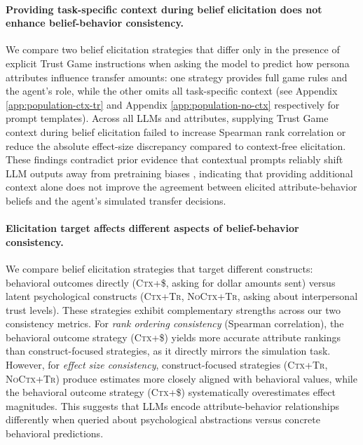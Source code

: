 \documentclass{article} %
\begin{document}
\paragraph{Providing task-specific context during belief elicitation does not enhance belief-behavior consistency.}
We compare two belief elicitation strategies that differ only in the presence of explicit Trust Game instructions when asking the model to predict how persona attributes influence transfer amounts: one strategy provides full game rules and the agent's role, while the other omits all task-specific context (see Appendix \ref{app:population-ctx-tr} and Appendix \ref{app:population-no-ctx} respectively for prompt templates). Across all LLMs and attributes, supplying Trust Game context during belief elicitation failed to increase Spearman rank correlation or reduce the absolute effect-size discrepancy compared to context-free elicitation. These findings contradict prior evidence that contextual prompts reliably shift LLM outputs away from pretraining biases \citep{Tao2024WhenCL}, indicating that providing additional context alone does not improve the agreement between elicited attribute-behavior beliefs and the agent's simulated transfer decisions.

\paragraph{Elicitation target affects different aspects of belief-behavior consistency.}
We compare belief elicitation strategies that target different constructs: behavioral outcomes directly (\textsc{Ctx+\$}, asking for dollar amounts sent) versus latent psychological constructs (\textsc{Ctx+Tr}, \textsc{NoCtx+Tr}, asking about interpersonal trust levels). These strategies exhibit complementary strengths across our two consistency metrics. For \textit{rank ordering consistency} (Spearman correlation), the behavioral outcome strategy (\textsc{Ctx+\$}) yields more accurate attribute rankings than construct-focused strategies, as it directly mirrors the simulation task. However, for \textit{effect size consistency}, construct-focused strategies (\textsc{Ctx+Tr}, \textsc{NoCtx+Tr}) produce estimates more closely aligned with behavioral values, while the behavioral outcome strategy (\textsc{Ctx+\$}) systematically overestimates effect magnitudes. This suggests that LLMs encode attribute-behavior relationships differently when queried about psychological abstractions versus concrete behavioral predictions.
\end{document}
